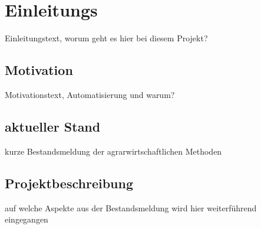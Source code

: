 
\section{Einleitungs}
Einleitungstext, worum geht es hier bei diesem Projekt?

\subsection{Motivation}
Motivationstext, Automatisierung und warum?

\subsection{aktueller Stand}
kurze Bestandsmeldung der agrarwirtschaftlichen Methoden

\subsection{Projektbeschreibung}
auf welche Aspekte aus der Bestandsmeldung wird hier weiterführend eingegangen
